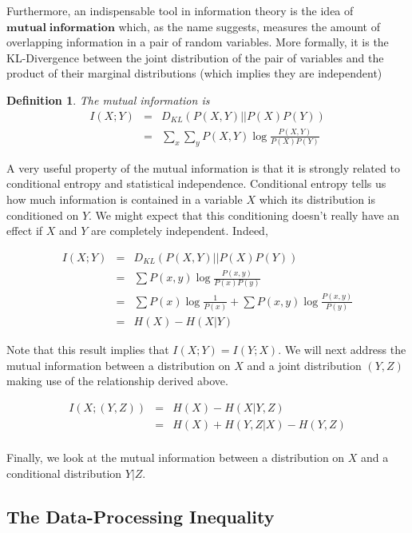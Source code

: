\documentclass[a4paper,11pt]{book}
\newtheorem{definition}{Definition}
\begin{document}
Furthermore, an indispensable tool in information theory is the idea of $\mathbf{mutual\;information}$ which, as the name suggests, measures the amount of overlapping information in a pair of random variables. More formally, it is the KL-Divergence between the joint distribution of the pair of variables and the product of their marginal distributions (which implies they are independent)

\begin{definition}
The mutual information is 
\begin{eqnarray*}
I(X;Y) &=& D_{KL}(P(X,Y)||P(X)P(Y)) \\
&=& \sum_{x}\sum_{y} P(X,Y) \log \frac{P(X,Y)}{P(X)P(Y)}
\end{eqnarray*}
\end{definition}

A very useful property of the mutual information is that it is strongly related to conditional entropy and statistical independence. Conditional entropy tells us how much information is contained in a variable $X$ which its distribution is conditioned on $Y$. We might expect that this conditioning doesn't really have an effect if $X$ and $Y$ are completely independent. Indeed,

\begin{eqnarray*}
I(X;Y) &=& D_{KL}(P(X,Y)||P(X)P(Y)) \\
&=& \sum P(x,y) \log \frac{P(x,y)}{P(x)P(y)}\\
&=& \sum P(x)\log \frac{1}{P(x)} + \sum P(x,y)\log \frac{P(x,y)}{P(y)} \\
 &=& H(X) - H(X|Y)
\end{eqnarray*}

Note that this result implies that $I(X;Y) = I(Y;X)$. We will next address the mutual information between a distribution on $X$ and a joint distribution $(Y,Z)$ making use of the relationship derived above. 

\begin{eqnarray*}
I(X;(Y,Z)) &=& H(X) - H(X|Y,Z)\\
&=& H(X) + H(Y,Z|X) - H(Y,Z)\\
\end{eqnarray*}

Finally, we look at the mutual information between a distribution on $X$ and a conditional distribution $Y|Z$.

\subsection{The Data-Processing Inequality}
\end{document}
